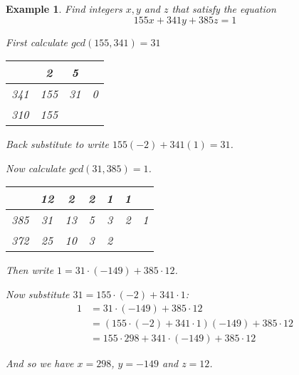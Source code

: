 \documentclass[letterpaper, 12pt, oneside]{memoir}
\theoremstyle{mystyle}
\newtheorem{example}[thm]{Example}
\begin{document}
\begin{example}
    Find integers $x, y$ and $z$ that satisfy the equation
    \[155x + 341y + 385z = 1 \]
    
    First calculate $gcd(155, 341) = 31$
    \begin{table}[H]
    \centering
    \begin{tabular}{c|c|c|c}
            & 2   & 5  &   \\ \hline
        341 & 155 & 31 & 0 \\ \hline
        310 & 155 &    & 
    \end{tabular}
    \end{table}
    
    Back substitute to write $155(-2) + 341(1)= 31$.
    
    Now calculate $gcd(31, 385) = 1$.
     \begin{table}[H]
    \centering
    \begin{tabular}{c|c|c|c|c|c|c}
            & 12  & 2   & 2  & 1  & 1  &   \\ \hline
        385 & 31  & 13  & 5  & 3  & 2  & 1 \\ \hline
        372 & 25  & 10  & 3  & 2  &    & 
    \end{tabular}
    \end{table}
    
    Then write $1 =  31 \cdot (-149) + 385 \cdot 12 $.
    
    Now substitute $31 = 155 \cdot (-2) + 341 \cdot 1$:
    \begin{align*}
        1 &= 31 \cdot (-149) + 385 \cdot 12 \\
          &= (155 \cdot (-2) + 341 \cdot 1) (-149) + 385 \cdot 12 \\
          &= 155 \cdot 298 + 341 \cdot (-149) + 385 \cdot 12
    \end{align*} 
    
    And so we have $x = 298$, $y = -149$ and $z = 12$.
    
\end{example}

\section{} 



\end{document}
